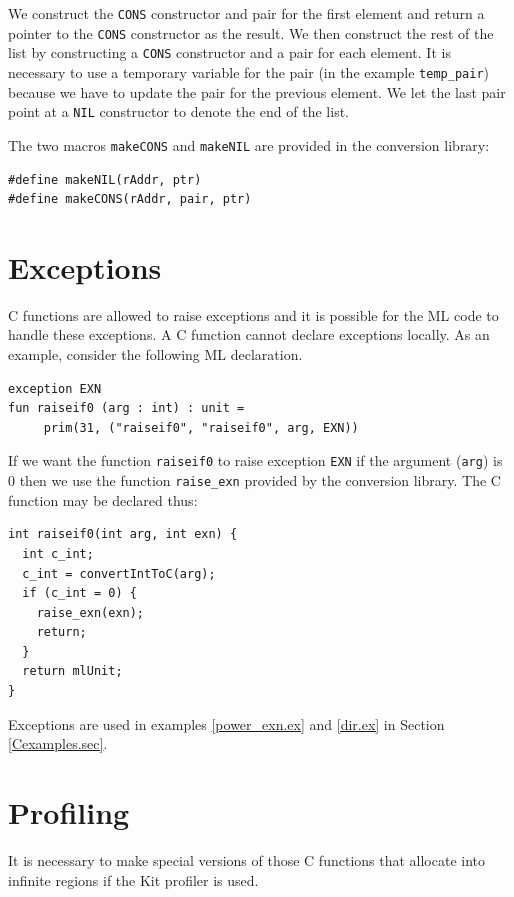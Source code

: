\documentclass[12pt]{book}
\begin{document}
\noindent We construct the \texttt{CONS} constructor and pair for the
first element and return a pointer to the \texttt{CONS} constructor as
the result. We then construct the rest of the list by constructing a
\texttt{CONS} constructor and a pair for each element. It is necessary
to use a temporary variable for the pair (in the example
\texttt{temp\_pair}) because we have to update the pair for the
previous element. We let the last pair point at a \texttt{NIL}
constructor to denote the end of the list.

The two macros \texttt{makeCONS} and \texttt{makeNIL} are provided in
the conversion library:

\begin{verbatim}
#define makeNIL(rAddr, ptr)
#define makeCONS(rAddr, pair, ptr)
\end{verbatim}

\section{Exceptions}
C functions are allowed to raise exceptions and it is possible for the
ML code to handle these exceptions. A C function cannot declare
exceptions locally. As an example, consider the following ML
declaration.

\begin{verbatim}
exception EXN
fun raiseif0 (arg : int) : unit = 
     prim(31, ("raiseif0", "raiseif0", arg, EXN))
\end{verbatim}

\noindent If we want the function \texttt{raiseif0} to raise exception
\texttt{EXN} if the argument (\texttt{arg}) is 0 then we use the
function \texttt{raise\_exn} provided by the conversion library. The C
function may be declared thus:

\begin{verbatim}
int raiseif0(int arg, int exn) {
  int c_int;
  c_int = convertIntToC(arg);
  if (c_int = 0) {
    raise_exn(exn);
    return;
  }
  return mlUnit;
}
\end{verbatim}

Exceptions are used in examples \ref{power_exn.ex} and \ref{dir.ex} in
Section \ref{Cexamples.sec}.

\section{Profiling\label{prof.sec}}
It is necessary to make special versions of those C functions that
allocate into infinite regions if the Kit profiler is used.
\end{document}
